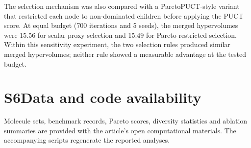 \documentclass[10pt,a4paper]{article}
\begin{document}
The selection mechanism was also compared with a ParetoPUCT-style variant that restricted each node to non-dominated children before applying the PUCT score. At equal budget (\num{700} iterations and \num{5} seeds), the merged hypervolumes were \num{15.56} for scalar-proxy selection and \num{15.49} for Pareto-restricted selection. Within this sensitivity experiment, the two selection rules produced similar merged hypervolumes; neither rule showed a measurable advantage at the tested budget.

\section*{S6\hspace{0.6em}Data and code availability}

Molecule sets, benchmark records, Pareto scores, diversity statistics and ablation summaries are provided with the article's open computational materials. The accompanying scripts regenerate the reported analyses.
\end{document}
